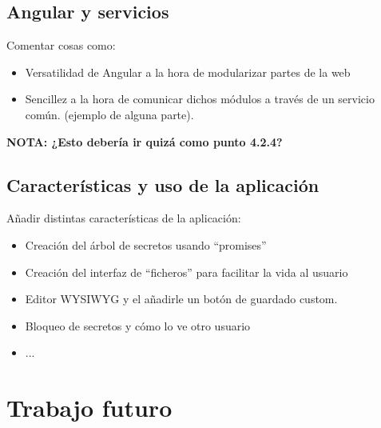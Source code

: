 \documentclass{\ClassPath/viu-tfm-template}
\begin{document}
\section{Angular y servicios}
{\color{red} Comentar cosas como:

    \begin{itemize}
        \item Versatilidad de Angular a la hora de modularizar partes de la web
        \item Sencillez a la hora de comunicar dichos módulos a través de un servicio común. (ejemplo de alguna parte).
    \end{itemize}

{{\large \textbf{NOTA: ¿Esto debería ir quizá como punto 4.2.4?}}}
}




\section{Características y uso de la aplicación}
{\color{red} Añadir distintas características de la aplicación:

    \begin{itemize}
        \item Creación del árbol de secretos usando “promises”
        \item Creación del interfaz de “ficheros” para facilitar la vida al usuario
        \item Editor WYSIWYG y el añadirle un botón de guardado custom.
        \item Bloqueo de secretos y cómo lo ve otro usuario
        \item ...
    \end{itemize}
}

\chapter{Trabajo futuro}


\end{document}
